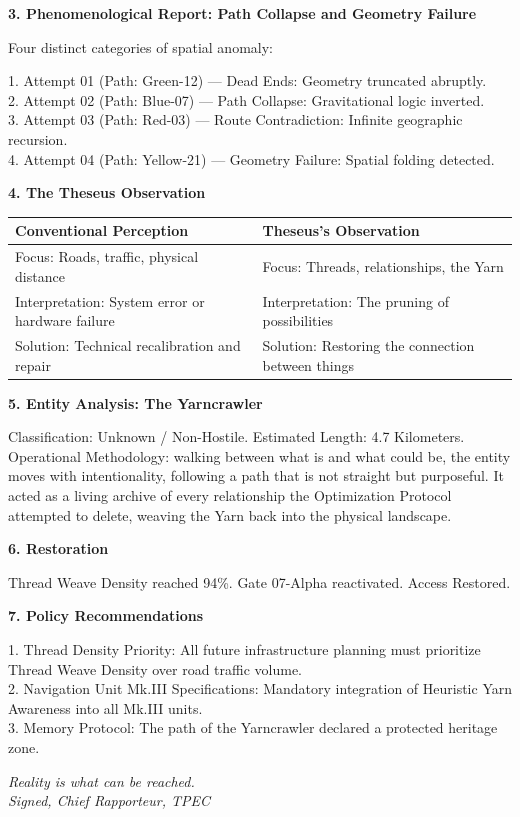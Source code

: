 \documentclass[11pt]{article}
\begin{document}
\begin{reportbox}
\textbf{3. Phenomenological Report: Path Collapse and Geometry Failure}

Four distinct categories of spatial anomaly:

1. Attempt 01 (Path: Green-12) --- Dead Ends: Geometry truncated abruptly.\\
2. Attempt 02 (Path: Blue-07) --- Path Collapse: Gravitational logic inverted.\\
3. Attempt 03 (Path: Red-03) --- Route Contradiction: Infinite geographic recursion.\\
4. Attempt 04 (Path: Yellow-21) --- Geometry Failure: Spatial folding detected.

\textbf{4. The Theseus Observation}

\begin{center}
\begin{tabular}{ll}
\toprule
\textbf{Conventional Perception} & \textbf{Theseus's Observation} \\
\midrule
Focus: Roads, traffic, physical distance & Focus: Threads, relationships, the Yarn \\
Interpretation: System error or hardware failure & Interpretation: The pruning of possibilities \\
Solution: Technical recalibration and repair & Solution: Restoring the connection between things \\
\bottomrule
\end{tabular}
\end{center}

\textbf{5. Entity Analysis: The Yarncrawler}

Classification: Unknown / Non-Hostile. Estimated Length: 4.7 Kilometers. Operational Methodology: walking between what is and what could be, the entity moves with intentionality, following a path that is not straight but purposeful. It acted as a living archive of every relationship the Optimization Protocol attempted to delete, weaving the Yarn back into the physical landscape.

\textbf{6. Restoration}

Thread Weave Density reached 94\%. Gate 07-Alpha reactivated. Access Restored.

\textbf{7. Policy Recommendations}

1. Thread Density Priority: All future infrastructure planning must prioritize Thread Weave Density over road traffic volume.\\
2. Navigation Unit Mk.III Specifications: Mandatory integration of Heuristic Yarn Awareness into all Mk.III units.\\
3. Memory Protocol: The path of the Yarncrawler declared a protected heritage zone.

\textit{Reality is what can be reached.}\\
\textit{Signed, Chief Rapporteur, TPEC}
\end{reportbox}
\end{document}
